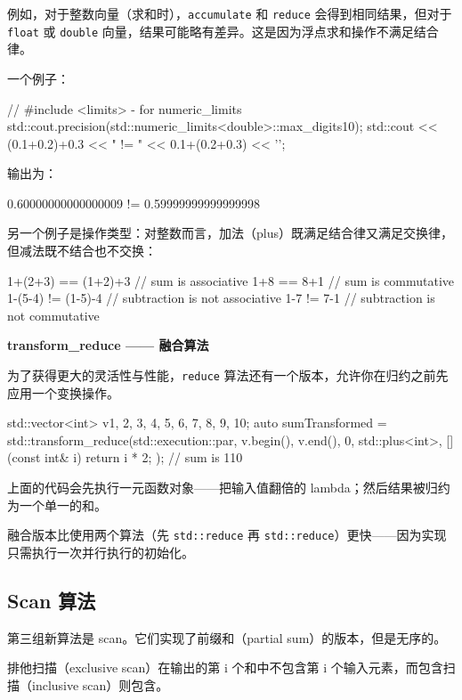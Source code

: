 例如，对于整数向量（求和时），\texttt{accumulate} 和 \texttt{reduce} 会得到相同结果，但对于 \texttt{float} 或 \texttt{double} 向量，结果可能略有差异。这是因为浮点求和操作不满足结合律。

一个例子：

\begin{codebox}[cpp]
// #include <limits> - for numeric_limits
std::cout.precision(std::numeric_limits<double>::max_digits10);
std::cout << (0.1+0.2)+0.3 << " != " << 0.1+(0.2+0.3) << '\n';
\end{codebox}

输出为：

\begin{codebox}[text]
0.60000000000000009 != 0.59999999999999998
\end{codebox}

另一个例子是操作类型：对整数而言，加法（plus）既满足结合律又满足交换律，但减法既不结合也不交换：

\begin{codebox}[cpp]
1+(2+3) == (1+2)+3 // sum is associative
1+8
== 8+1
// sum is commutative
1-(5-4) != (1-5)-4 // subtraction is not associative
1-7
!= 7-1
// subtraction is not commutative
\end{codebox}

\textbf{transform\_reduce —— 融合算法}

为了获得更大的灵活性与性能，\texttt{reduce} 算法还有一个版本，允许你在归约之前先应用一个变换操作。

\begin{codebox}[cpp]
std::vector<int> v{1, 2, 3, 4, 5, 6, 7, 8, 9, 10};
auto sumTransformed = std::transform_reduce(std::execution::par,
v.begin(),
v.end(),
0,
std::plus<int>{},
[](const int& i) { return i * 2; }
);
// sum is 110
\end{codebox}

上面的代码会先执行一元函数对象——把输入值翻倍的 lambda；然后结果被归约为一个单一的和。

融合版本比使用两个算法（先 \texttt{std::reduce} 再 \texttt{std::reduce}）更快——因为实现只需执行一次并行执行的初始化。


\subsection{Scan 算法}

第三组新算法是 scan。它们实现了前缀和（partial sum）的版本，但是无序的。

排他扫描（exclusive scan）在输出的第 i 个和中不包含第 i 个输入元素，而包含扫描（inclusive scan）则包含。

